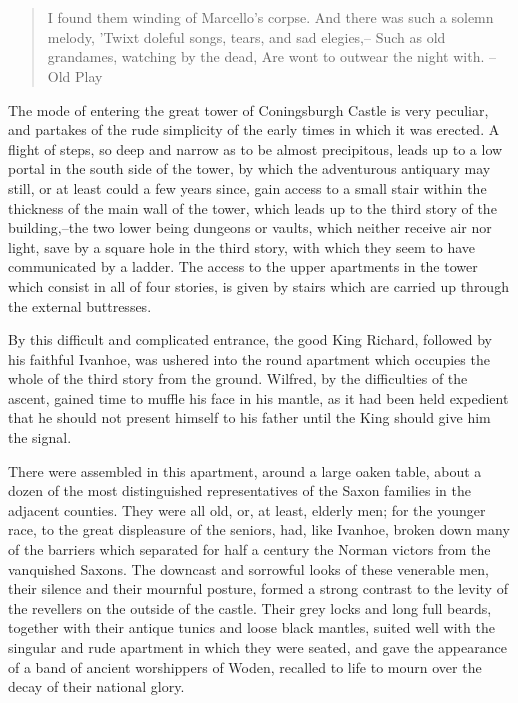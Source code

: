 \chapter{}

\begin{quote}
I found them winding of Marcello's corpse.
And there was such a solemn melody,
'Twixt doleful songs, tears, and sad elegies,--
Such as old grandames, watching by the dead,
Are wont to outwear the night with.
--Old Play
\end{quote}

The mode of entering the great tower of Coningsburgh Castle is very
peculiar, and partakes of the rude simplicity of the early times in
which it was erected. A flight of steps, so deep and narrow as to be
almost precipitous, leads up to a low portal in the south side of the
tower, by which the adventurous antiquary may still, or at least could a
few years since, gain access to a small stair within the thickness of
the main wall of the tower, which leads up to the third story of the
building,--the two lower being dungeons or vaults, which neither receive
air nor light, save by a square hole in the third story, with which they
seem to have communicated by a ladder. The access to the upper
apartments in the tower which consist in all of four stories, is given
by stairs which are carried up through the external buttresses.

By this difficult and complicated entrance, the good King Richard,
followed by his faithful Ivanhoe, was ushered into the round apartment
which occupies the whole of the third story from the ground. Wilfred, by
the difficulties of the ascent, gained time to muffle his face in his
mantle, as it had been held expedient that he should not present himself
to his father until the King should give him the signal.

There were assembled in this apartment, around a large oaken table,
about a dozen of the most distinguished representatives of the Saxon
families in the adjacent counties. They were all old, or, at least,
elderly men; for the younger race, to the great displeasure of the
seniors, had, like Ivanhoe, broken down many of the barriers which
separated for half a century the Norman victors from the vanquished
Saxons. The downcast and sorrowful looks of these venerable men, their
silence and their mournful posture, formed a strong contrast to the
levity of the revellers on the outside of the castle. Their grey locks
and long full beards, together with their antique tunics and loose black
mantles, suited well with the singular and rude apartment in which they
were seated, and gave the appearance of a band of ancient worshippers of
Woden, recalled to life to mourn over the decay of their national glory.

